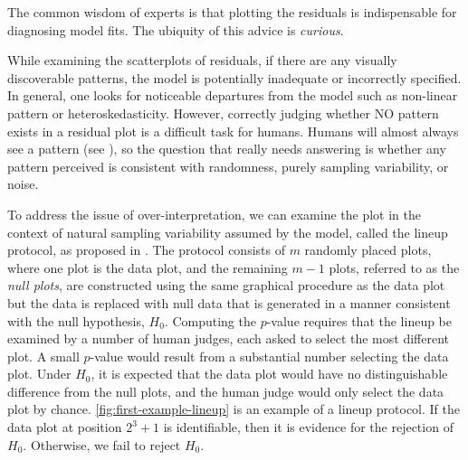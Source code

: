 \documentclass{vgtc}                          %
\begin{document}
\noindent The common wisdom of experts is that plotting the residuals is
indispensable for diagnosing model fits. The ubiquity of this advice is
\emph{curious}.

While examining the scatterplots of residuals, if there are any visually 
discoverable patterns, the model is potentially inadequate or incorrectly 
specified. In general,
one looks for noticeable departures from the model such as non-linear
pattern or heteroskedasticity. However, correctly 
judging whether NO pattern exists in a residual plot is a
difficult task for humans. Humans will almost always see a pattern (see
\cite{kahneman2011thinking}), so the question that really needs
answering is whether any pattern perceived is consistent with
randomness, purely sampling variability, or noise. 

To address the issue of over-interpretation, we can examine the plot in
the context of natural sampling variability assumed by the model, called
the lineup protocol, as proposed in \cite{buja2009statistical}. 
The protocol consists of \(m\) randomly placed plots, where one plot is the
data plot, and the remaining \(m - 1\) plots, referred to as the
\emph{null plots}, are constructed using the same graphical procedure as
the data plot but the data is replaced with null data that is generated
in a manner consistent with the null hypothesis, \(H_0\). 
Computing the \(p\)-value requires that the 
lineup be examined by a number of human judges, 
each asked to select the most different plot. 
A small $p$-value would result from a substantial number 
selecting the data plot. Under \(H_0\), 
it is expected that the data plot would have no distinguishable difference 
from the null plots, and the human judge would only select the data plot 
by chance.
\autoref{fig:first-example-lineup} is an example of a lineup
protocol. If the data plot at position \(2^3 + 1\) is identifiable, then
it is evidence for the rejection of \(H_0\). Otherwise, 
we fail to reject \(H_0\). 
\end{document}
